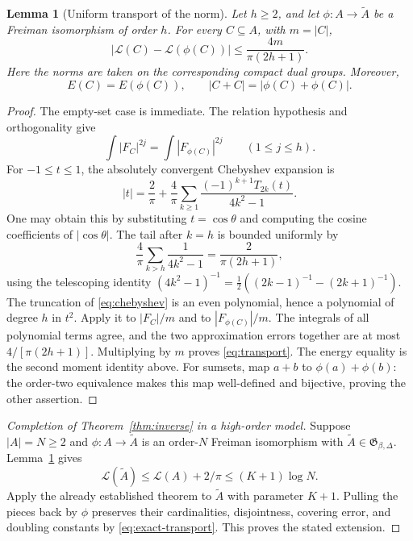 \documentclass[11pt,reqno]{amsart}
\numberwithin{equation}{section}
\newtheorem{lemma}[theorem]{Lemma}
\theoremstyle{definition}
\theoremstyle{remark}
\newcommand{\La}{\mathcal L}
\begin{document}
\begin{lemma}[Uniform transport of the norm]\label{lem:transport}
Let $h\ge2$, and let $\phi:A\to\widetilde A$ be a Freiman isomorphism
of order $h$. For every $C\subseteq A$, with $m=|C|$,
\begin{equation}\label{eq:transport}
 |\La(C)-\La(\phi(C))|\le\frac{4m}{\pi(2h+1)}.
\end{equation}
Here the norms are taken on the corresponding compact dual groups.
Moreover,
\begin{equation}\label{eq:exact-transport}
 E(C)=E(\phi(C)),\qquad |C+C|=|\phi(C)+\phi(C)|.
\end{equation}
\end{lemma}
\begin{proof}
The empty-set case is immediate. The relation hypothesis and
orthogonality give
\[
 \int|F_C|^{2j}=\int|F_{\phi(C)}|^{2j}\qquad(1\le j\le h).
\]
For $-1\le t\le1$, the absolutely convergent Chebyshev expansion is
\begin{equation}\label{eq:chebyshev}
 |t|=\frac2\pi+\frac4\pi\sum_{k\ge1}
       \frac{(-1)^{k+1}T_{2k}(t)}{4k^2-1}.
\end{equation}
One may obtain this by substituting $t=\cos\theta$ and computing the
cosine coefficients of $|\cos\theta|$. The tail after $k=h$ is bounded
uniformly by
\[
 \frac4\pi\sum_{k>h}\frac1{4k^2-1}
 =\frac2{\pi(2h+1)},
\]
using the telescoping identity
$(4k^2-1)^{-1}=\tfrac12((2k-1)^{-1}-(2k+1)^{-1})$.
The truncation of \eqref{eq:chebyshev} is an even polynomial, hence a
polynomial of degree $h$ in $t^2$. Apply it to $|F_C|/m$ and to
$|F_{\phi(C)}|/m$. The integrals of all polynomial terms agree, and
the two approximation errors together are at most
$4/[\pi(2h+1)]$. Multiplying by $m$ proves \eqref{eq:transport}.
The energy equality is the second moment identity above. For sumsets,
map $a+b$ to $\phi(a)+\phi(b)$: the order-two equivalence makes this
map well-defined and bijective, proving the other assertion.
\end{proof}

\begin{proof}[Completion of Theorem~\ref{thm:inverse} in a high-order model]
Suppose $|A|=N\ge2$ and $\phi:A\to\widetilde A$ is an order-$N$
Freiman isomorphism with $\widetilde A\in\mathfrak G_{\beta,\Delta}$.
Lemma~\ref{lem:transport} gives
\[
 \La(\widetilde A)\le\La(A)+2/\pi
                  \le(K+1)\log N.
\]
Apply the already established theorem to $\widetilde A$ with parameter
$K+1$. Pulling the pieces back by $\phi$ preserves their cardinalities,
disjointness, covering error, and doubling constants by
\eqref{eq:exact-transport}. This proves the stated extension.
\end{proof}
\end{document}
